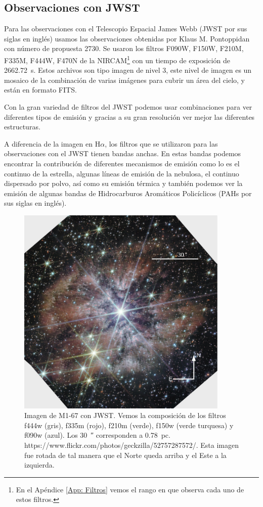 \documentclass{book}
\begin{document}
\subsection{Observaciones con JWST}

Para las observaciones con el Telescopio Espacial James Webb (JWST por
sus siglas en inglés) usamos las observaciones obtenidas por Klaus M.
Pontoppidan con número de propuesta 2730. Se usaron los filtros F090W,
F150W, F210M, F335M, F444W, F470N de la NIRCAM\footnote{En el Apéndice
  \ref{App: Filtros} vemos el rango en que observa cada uno de estos
  filtros.} con un tiempo de exposición de \SI{2662.72}{s}. Estos
archivos son tipo imagen de nivel 3, este nivel de imagen es un
mosaico de la combinación de varias imágenes para cubrir un área del
cielo, y están en formato FITS.

Con la gran variedad de filtros del JWST podemos usar combinaciones
para ver diferentes tipos de emisión y gracias a su gran resolución
ver mejor las diferentes estructuras.

A diferencia de la imagen en H$\alpha$, los filtros que se utilizaron para
las observaciones con el JWST tienen bandas anchas. En estas bandas
podemos encontrar la contribución de diferentes mecanismos de emisión
como lo es el continuo de la estrella, algunas líneas de emisión de la
nebulosa, el continuo dispersado por polvo, así como su emisión
térmica y también podemos ver la emisión de algunas bandas de
Hidrocarburos Aromáticos Policíclicos (PAHs por sus siglas en inglés).

\begin{figure}[htb]
    \centering
    \includegraphics[width=0.9\textwidth]{ultimas correcciones/WR124_JWST.pdf}
    \caption{Imagen de M1-67 con JWST. Vemos la composición de los
      filtros f444w (gris), f335m (rojo), f210m (verde), f150w (verde
      turquesa) y f090w (azul). Los \SI{30}{\arcsecond} corresponden a
      \SI{0.78}{pc}.
      https://www.flickr.com/photos/geckzilla/52757287572/. Esta
      imagen fue rotada de tal manera que el Norte queda arriba y el
      Este a la izquierda.}
    \label{fig:M1-67JWST}
\end{figure}
\end{document}
